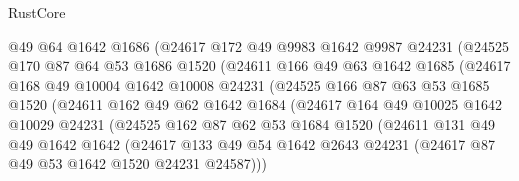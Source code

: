 \begin{lexlean}{RustCore}
\begin{coremodule}
                    @49
                    @64
                    @1642
                    @1686
                    (@24617
                      @172
                      @49
                      @9983
                      @1642
                      @9987
                      @24231
                      (@24525
                        @170
                        @87
                        @64
                        @53
                        @1686
                        @1520
                        (@24611
                          @166
                          @49
                          @63
                          @1642
                          @1685
                          (@24617
                            @168
                            @49
                            @10004
                            @1642
                            @10008
                            @24231
                            (@24525
                              @166
                              @87
                              @63
                              @53
                              @1685
                              @1520
                              (@24611
                                @162
                                @49
                                @62
                                @1642
                                @1684
                                (@24617
                                  @164
                                  @49
                                  @10025
                                  @1642
                                  @10029
                                  @24231
                                  (@24525
                                    @162
                                    @87
                                    @62
                                    @53
                                    @1684
                                    @1520
                                    (@24611
                                      @131
                                      @49
                                      @49
                                      @1642
                                      @1642
                                      (@24617
                                        @133
                                        @49
                                        @54
                                        @1642
                                        @2643
                                        @24231
                                        (@24617 @87 @49 @53 @1642 @1520 @24231 @24587)))

\end{coremodule}
\end{lexlean}
